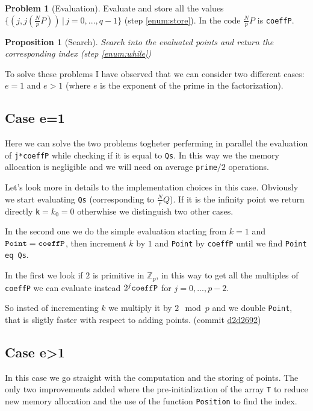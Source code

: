 \documentclass{article}
\theoremstyle{plain}
\newtheorem{prop}[teo]{Proposition}
\theoremstyle{remark}
\theoremstyle{definition}
\newtheorem{prob}[teo]{Problem}
\begin{document}
\begin{prob}[Evaluation]
	Evaluate and store all the values $\{ (j,j\left(\frac{N}{p}P\right)) \,|\, j = 0,...,q-1 \}$ (step \ref{enum:store}). In the code $\frac{N}{p}P$ is \verb|coeffP|. 
\end{prob}

\begin{prop}[Search]
	Search into the evaluated points and return the corresponding index (step \ref{enum:while})
\end{prop}

To solve these problems I have observed that we can consider two different cases: $e=1$ and $e>1$ (where $e$ is the exponent of the prime in the factorization).

\subsection{Case e=1}
Here we can solve the two problems togheter perferming in parallel the evaluation of \verb|j*coeffP| while checking if it is equal to \verb|Qs|. In this way we the memory allocation is negligible and we will need on average \verb|prime|$/2$ operations. 

Let's look more in details to the implementation choices in this case. Obviously we start evaluating \texttt{Qs} (corresponding to $\frac{N}{r}Q$). If it is the infinity point we return directly \verb|k|$=k_0 = 0$ otherwhise we distinguish two other cases. 

In the second one we do the simple evaluation starting from $k = 1$ and $\verb|Point| = \verb|coeffP|$, then increment $k$ by $1$ and \verb|Point| by \verb|coeffP| until we find \verb|Point eq Qs|.

In the first we look if $2$ is primitive in $\mathbb{Z}_p$, in this way to get all the multiples of \verb|coeffP| we can evaluate instead $2^j\verb|coeffP|$ for $j = 0, ..., p-2$. 

So insted of incrementing $k$ we multiply it by $2 \mod p$ and we double \verb|Point|, that is sligtly faster with respect to adding points. (commit \href{https://github.com/giacomoborin/project2_MAGMA/commit/d2d2692170bebfa2b465307761de5c7ee52121bf}{d2d2692})

\subsection{Case e>1}

In this case we go straight with the computation and the storing of points. The only two improvements added where the pre-initialization of the array \verb|T| to reduce new memory allocation and the use of the function \verb|Position| to find the index.
\end{document}
